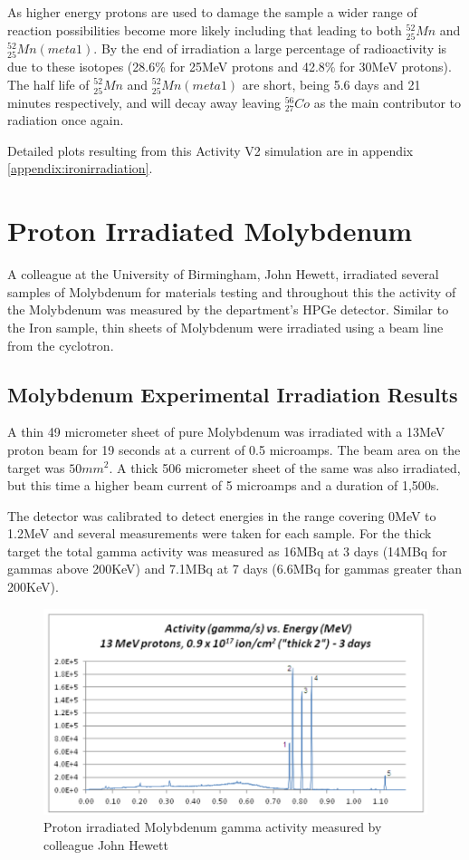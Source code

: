 As higher energy protons are used to damage the sample a wider range of reaction possibilities become more likely including that leading to both ${}^{52}_{25}Mn$ and ${}^{52}_{25}Mn (meta 1)$.  By the end of irradiation a large percentage of radioactivity is due to these isotopes (28.6\% for 25MeV protons and 42.8\% for 30MeV protons).  The half life of ${}^{52}_{25}Mn$ and ${}^{52}_{25}Mn (meta 1)$ are short, being 5.6 days and 21 minutes respectively, and will decay away leaving ${}^{56}_{27}Co$ as the main contributor to radiation once again.

Detailed plots resulting from this Activity V2 simulation are in appendix \ref{appendix:ironirradiation}.





\section{Proton Irradiated Molybdenum}

A colleague at the University of Birmingham, John Hewett, irradiated several samples of Molybdenum for materials testing and throughout this the activity of the Molybdenum was measured by the department's HPGe detector\cite{johnhewett}.  Similar to the Iron sample, thin sheets of Molybdenum were irradiated using a beam line from the cyclotron.


\subsection[Experimental Irradiation - Molybdenum]{Molybdenum Experimental Irradiation Results}

A thin 49 micrometer sheet of pure Molybdenum was irradiated with a 13MeV proton beam for 19 seconds at a current of 0.5 microamps.  The beam area on the target was $50mm^2$.  A thick 506 micrometer sheet of the same was also irradiated, but this time a higher beam current of  5 microamps and a duration of 1,500s.

The detector was calibrated to detect energies in the range covering 0MeV to 1.2MeV and several measurements were taken for each sample.  For the thick target the total gamma activity was measured as 16MBq at 3 days (14MBq for gammas above 200KeV) and 7.1MBq at 7 days (6.6MBq for gammas greater than 200KeV).

\begin{figure}[htb]
\centering
\includegraphics[width=0.7\linewidth]{chapters/activity_code/mo-john-hewett/john_mo_results.png}
\caption{Proton irradiated Molybdenum gamma activity measured by colleague John Hewett}
\label{fig:john-hewett-mo}
\end{figure}

